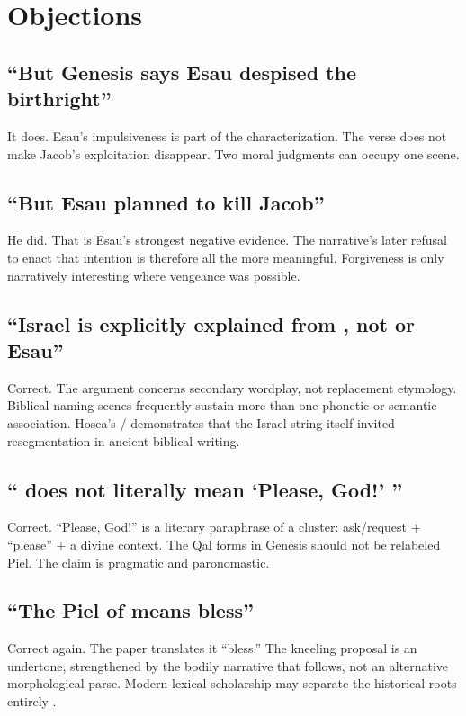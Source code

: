 \section{Objections}

\subsection{``But Genesis says Esau despised the birthright''}

It does. Esau's impulsiveness is part of the characterization. The verse does not make Jacob's exploitation disappear. Two moral judgments can occupy one scene.

\subsection{``But Esau planned to kill Jacob''}

He did. That is Esau's strongest negative evidence. The narrative's later refusal to enact that intention is therefore all the more meaningful. Forgiveness is only narratively interesting where vengeance was possible.

\subsection{``Israel is explicitly explained from , not  or Esau''}

Correct. The argument concerns secondary wordplay, not replacement etymology. Biblical naming scenes frequently sustain more than one phonetic or semantic association. Hosea's / demonstrates that the Israel string itself invited resegmentation in ancient biblical writing.

\subsection{`` does not literally mean `Please, God!' ''}

Correct. ``Please, God!'' is a literary paraphrase of a cluster: ask/request +  ``please'' + a divine context. The Qal forms in Genesis should not be relabeled Piel. The claim is pragmatic and paronomastic.

\subsection{``The Piel of  means bless''}

Correct again. The paper translates it ``bless.'' The kneeling proposal is an undertone, strengthened by the bodily narrative that follows, not an alternative morphological parse. Modern lexical scholarship may separate the historical roots entirely \parencite{Aitken2007,SAHDBRK}.

